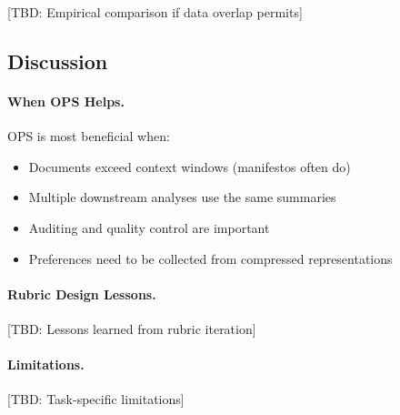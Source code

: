 [TBD: Empirical comparison if data overlap permits]

\subsection{Discussion}

\paragraph{When OPS Helps.}
OPS is most beneficial when:
\begin{itemize}[nosep]
    \item Documents exceed context windows (manifestos often do)
    \item Multiple downstream analyses use the same summaries
    \item Auditing and quality control are important
    \item Preferences need to be collected from compressed representations
\end{itemize}

\paragraph{Rubric Design Lessons.}
[TBD: Lessons learned from rubric iteration]

\paragraph{Limitations.}
[TBD: Task-specific limitations]
